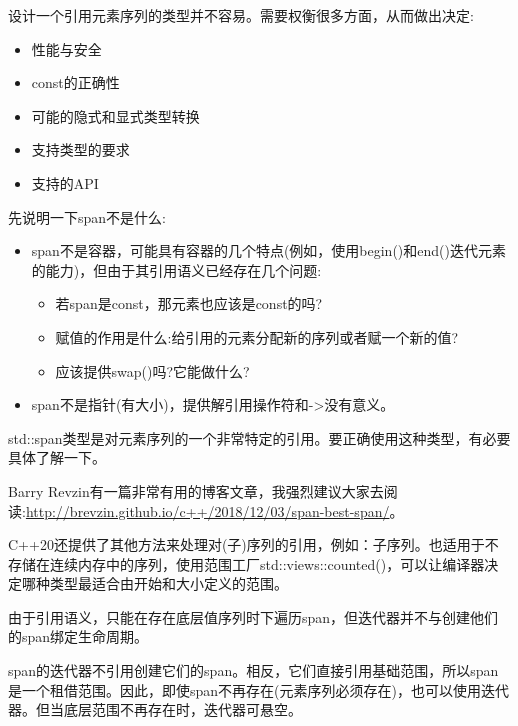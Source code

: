 
设计一个引用元素序列的类型并不容易。需要权衡很多方面，从而做出决定:

\begin{itemize}
\item
性能与安全

\item
const的正确性

\item
可能的隐式和显式类型转换

\item
支持类型的要求

\item
支持的API
\end{itemize}

先说明一下span不是什么:

\begin{itemize}
\item
span不是容器，可能具有容器的几个特点(例如，使用begin()和end()迭代元素的能力)，但由于其引用语义已经存在几个问题:

\begin{itemize}
\item
若span是const，那元素也应该是const的吗?

\item
赋值的作用是什么:给引用的元素分配新的序列或者赋一个新的值?

\item
应该提供swap()吗?它能做什么?
\end{itemize}

\item
span不是指针(有大小)，提供解引用操作符和->没有意义。
\end{itemize}

std::span类型是对元素序列的一个非常特定的引用。要正确使用这种类型，有必要具体了解一下。

Barry Revzin有一篇非常有用的博客文章，我强烈建议大家去阅读:\url{http://brevzin.github.io/c++/2018/12/03/span-best-span/}。

C++20还提供了其他方法来处理对(子)序列的引用，例如：子序列。也适用于不存储在连续内存中的序列，使用范围工厂std::views::counted()，可以让编译器决定哪种类型最适合由开始和大小定义的范围。


由于引用语义，只能在存在底层值序列时下遍历span，但迭代器并不与创建他们的span绑定生命周期。

span的迭代器不引用创建它们的span。相反，它们直接引用基础范围，所以span是一个租借范围。因此，即使span不再存在(元素序列必须存在)，也可以使用迭代器。但当底层范围不再存在时，迭代器可悬空。

